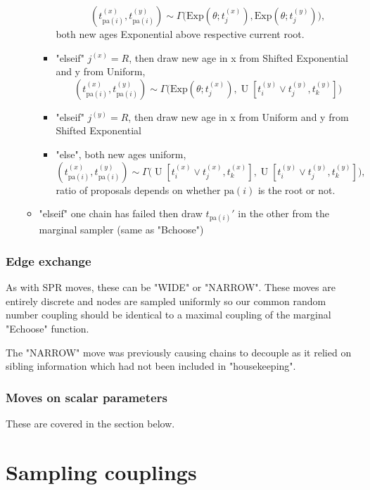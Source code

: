 \documentclass[11pt,a4paper]{article}
\newcommand{\pa}{\mathrm{pa}}
\newcommand{\Exp}[1]{\mathrm{Exp}(#1)}
\DeclareMathOperator*{\Unif}{\mathrm{U}}
\begin{document}
\begin{enumerate}
\begin{itemize}
\begin{itemize}
            \[
                (t_{\pa(i)}^{(x)}, t_{\pa(i)}^{(y)}) \sim \Gamma\big(\Exp{\theta; t_j^{(x)}}, \Exp{\theta; t_j^{(y)}}\big),
            \]
            both new ages Exponential above respective current root.
            \item "elseif" $ j^{(x)} = R $, then draw new age in x from Shifted Exponential and y from Uniform,
            \[
                (t_{\pa(i)}^{(x)}, t_{\pa(i)}^{(y)}) \sim \Gamma\big(\Exp{\theta; t_j^{(x)}}, \Unif[t_i^{(y)} \vee t_j^{(y)}, t_k^{(y)}]\big)
            \]
            \item "elseif" $ j^{(y)} = R $, then draw new age in x from Uniform and y from Shifted Exponential
            \item "else", both new ages uniform,
            \[
                (t_{\pa(i)}^{(x)}, t_{\pa(i)}^{(y)}) \sim \Gamma\big(\Unif[t_i^{(x)} \vee t_j^{(x)}, t_k^{(x)}], \Unif[t_i^{(y)} \vee t_j^{(y)}, t_k^{(y)}]\big),
            \]
            ratio of proposals depends on whether $ \pa(i) $ is the root or not.
        \end{itemize}
        \item "elseif" one chain has failed then draw $ t_{\pa(i)}' $ in the other from the marginal sampler (same as "Bchoose")
    \end{itemize}
\end{enumerate}

\subsubsection{Edge exchange}

As with SPR moves, these can be "WIDE" or "NARROW". These moves are entirely discrete and nodes are sampled uniformly so our common random number coupling should be identical to a maximal coupling of the marginal "Echoose" function.

The "NARROW" move was previously causing chains to decouple as it relied on sibling information which had not been included in "housekeeping".

\subsubsection{Moves on scalar parameters}

These are covered in the section below.


\section{Sampling couplings}
\end{document}
